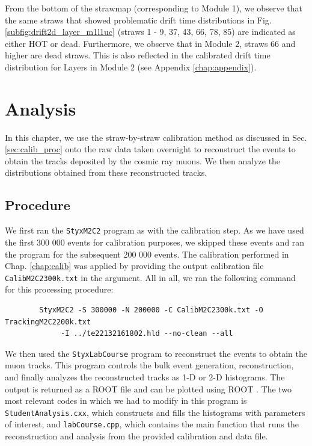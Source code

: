 \documentclass[a4paper]{report}
\numberwithin{equation}{section}
\begin{document}
From the bottom of the strawmap (corresponding to Module 1), we observe that the same straws that showed problematic drift time distributions
in Fig. \ref{subfig:drift2d_layer_m1l1uc} (straws 1 - 9, 37, 43, 66, 78, 85) are indicated as either HOT or dead. Furthermore, 
we observe that in Module 2, straws 66 and higher are dead straws. This is also reflected in the calibrated drift time distribution 
for Layers in Module 2 (see Appendix \ref{chap:appendix}). \par 

\chapter{Analysis} \label{chap:track_analysis}

In this chapter, we use the straw-by-straw calibration method as discussed in Sec. \ref{sec:calib_proc} onto the 
raw data taken overnight to reconstruct the events to obtain the tracks deposited by the cosmic ray muons. 
We then analyze the distributions obtained from these reconstructed tracks. \par 

\section{Procedure} \label{sec:analysis_proced}

We first ran the \texttt{StyxM2C2} program as with the calibration step. As we have used the first 300 000 events for 
calibration purposes, we skipped these events and ran the program for the subsequent 200 000 events. The calibration 
performed in Chap. \ref{chap:calib} was applied by providing the output calibration file \texttt{CalibM2C2300k.txt} in the argument. 
All in all, we ran the following command for this processing procedure: 
\begin{tcolorbox}
	\begin{verbatim}
		StyxM2C2 -S 300000 -N 200000 -C CalibM2C2300k.txt -O TrackingM2C2200k.txt
			 -I ../te22132161802.hld --no-clean --all
	\end{verbatim}
\end{tcolorbox}

We then used the \texttt{StyxLabCourse} program to reconstruct the events to obtain the muon tracks. This program controls the 
bulk event generation, reconstruction, and finally analyzes the reconstructed tracks as 1-D or 2-D histograms. 
The output is returned as a ROOT file and can be plotted using ROOT \cite{labman}. The two most relevant codes in which we had 
to modify in this program is \texttt{StudentAnalysis.cxx}, which constructs and fills the histograms with parameters of interest,
and \texttt{labCourse.cpp}, which contains the main function that runs the reconstruction and analysis from the provided 
calibration and data file. \par 
\end{document}
